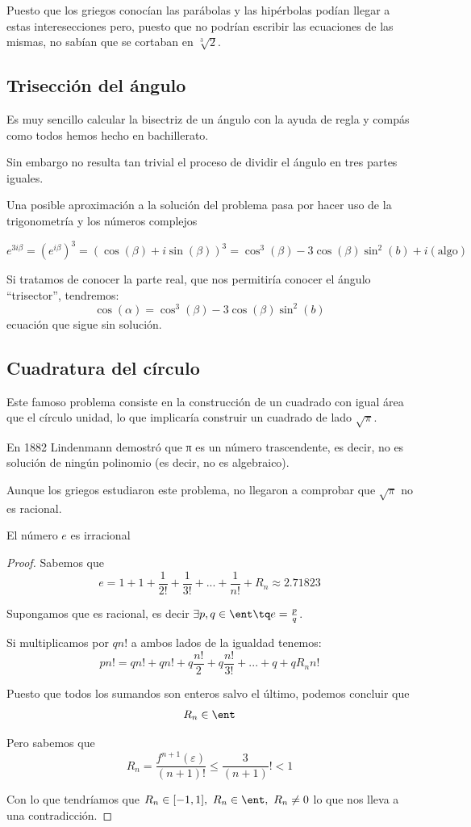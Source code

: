 \documentclass{apuntes}
\begin{document}
Puesto que los griegos conocían las parábolas y las hipérbolas podían llegar a estas interesecciones pero, puesto que no podrían escribir las ecuaciones de las mismas, no sabían que se cortaban en $\sqrt[3]{2}$.

\subsection{Trisección del ángulo}
Es muy sencillo calcular la bisectriz de un ángulo con la ayuda de regla y compás como todos hemos hecho en bachillerato.

Sin embargo no resulta tan trivial el proceso de dividir el ángulo en tres partes iguales.

Una posible aproximación a la solución del problema pasa por hacer uso de la trigonometría y los números complejos

\[e^{3iβ} = (e^{iβ})^3 = (\cos (β) + i \sin (β))^3 = \cos^3(β)-3\cos(β)\sin^2(b)+i(\text{algo})\]

Si tratamos de conocer la parte real, que nos permitiría conocer el ángulo ``trisector'', tendremos:
\[\cos(α)=\cos^3(β)-3\cos(β)\sin^2(b)\]
ecuación que sigue sin solución.

\subsection{Cuadratura del círculo}
Este famoso problema consiste en la construcción de un cuadrado con igual área que el círculo unidad, lo que implicaría construir un cuadrado de lado $\sqrt{π}$.

En 1882 Lindenmann demostró que π es un número trascendente, es decir, no es solución de ningún polinomio (es decir, no es algebraico).

Aunque los griegos estudiaron este problema, no llegaron a comprobar que $\sqrt{π}$ no es racional.

\begin{theorem}
El número $e$ es irracional
\end{theorem}
\begin{proof}
Sabemos que
\[e = 1+1+\frac{1}{2!}+\frac{1}{3!}+...+\frac{1}{n!} + R_n \approx 2.71823\]

Supongamos que es racional, es decir $\exists p, q \in \ent \tq e = \frac{p}{q}$.

Si multiplicamos por $qn!$ a ambos lados de la igualdad tenemos:
\[pn! = qn!+qn!+q\frac{n!}{2} +q \frac{n!}{3!} + ... + q + qR_nn!\]

Puesto que todos los sumandos son enteros salvo el último, podemos concluir que
\[R_n \in \ent\]

Pero sabemos que
\[R_n = \frac{f^{n+1}(ε)}{(n+1)!} \leq \frac{3}{(n+1)}!<1\]

Con lo que tendríamos que $R_n \in [-1,1], \ R_n \in \ent, \ R_n \neq 0$ lo que nos lleva a una contradicción.
\end{proof}
\end{document}
